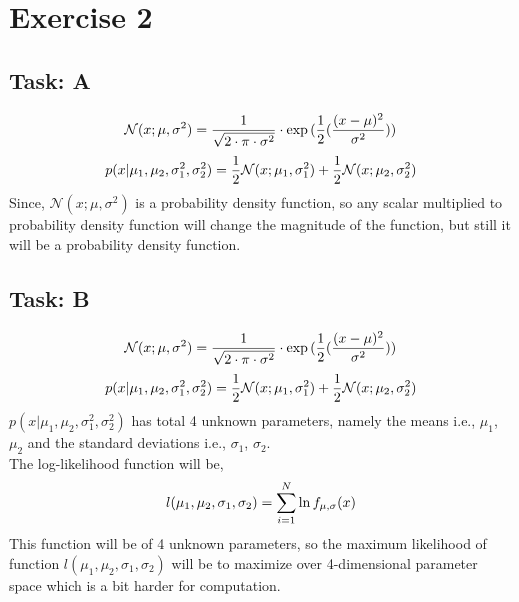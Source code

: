 \documentclass{article}
\numberwithin{equation}{section}
\begin{document}
\section{Exercise 2 }
\subsection{Task: A}

\begin{equation}\label{eq10}
\mathcal{N}(x; \mu, \sigma^2) = \frac{1}{\sqrt{2 \cdot \pi \cdot \sigma^2}}\cdot \exp{(\frac{1}{2}(\frac{(x-\mu)^2}{\sigma^2}))} \\
\end{equation}
\begin{equation}\label{eq11}
p(x|\mu_1, \mu_2, \sigma_1^2, \sigma_2^2) = \frac{1}{2}\mathcal{N}(x; \mu_1, \sigma_1^2) + \frac{1}{2}\mathcal{N}(x; \mu_2, \sigma_2^2) \\
\end{equation}
Since, $\mathcal{N}(x; \mu, \sigma^2)$ is a probability density function, so any scalar multiplied to probability density function will change the magnitude of the function, but still it will be a probability density function. \\

\subsection{Task: B}

\begin{equation}\label{eq12}
\mathcal{N}(x; \mu, \sigma^2) = \frac{1}{\sqrt{2 \cdot \pi \cdot \sigma^2}}\cdot \exp{(\frac{1}{2}(\frac{(x-\mu)^2}{\sigma^2}))} \\
\end{equation}
\begin{equation}\label{eq13}
p(x|\mu_1, \mu_2, \sigma_1^2, \sigma_2^2) = \frac{1}{2}\mathcal{N}(x; \mu_1, \sigma_1^2) + \frac{1}{2}\mathcal{N}(x; \mu_2, \sigma_2^2) \\
\end{equation}
$p(x|\mu_1, \mu_2, \sigma_1^2, \sigma_2^2)$ has total 4 unknown parameters, namely the means i.e., $\mu_1$, $\mu_2$ and the standard deviations i.e., $\sigma_1$, $\sigma_2$. \\
The log-likelihood function will be, \\
\begin{equation}\label{eq14}
l(\mu_1, \mu_2, \sigma_1, \sigma_2) = \sum_{i=1}^{N} \ln{f_{\mu,\sigma}(x)} \\
\end{equation}
This function will be of 4 unknown parameters, so the maximum likelihood of function $l(\mu_1, \mu_2, \sigma_1, \sigma_2)$ will be to maximize over 4-dimensional parameter space which is a bit harder for computation.  
\end{document}
